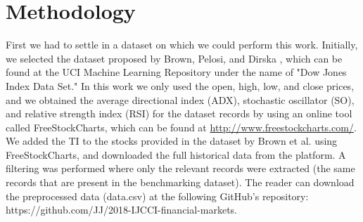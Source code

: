 \documentclass[a4paper,twoside]{article}
\begin{document}



\section{Methodology}
\label{proposed-method}


First we had to settle in a dataset on which we could perform this
work. Initially, we selected the dataset proposed  by Brown, Pelosi, and
Dirska \cite{brown2013dynamic}, which can be found at the UCI Machine
Learning Repository under the name of "Dow Jones Index Data Set." %
In
this work we only used the open, high, low, and close prices, and we
obtained the average directional index (ADX), stochastic oscillator
(SO), and relative strength index (RSI) for the dataset records by
using an online tool called FreeStockCharts, which can be found at
\url{http://www.freestockcharts.com/}. We added the TI to the stocks
provided in the dataset by Brown et al. using FreeStockCharts, and
downloaded the full historical data from the platform. A filtering was
performed where only the relevant records were extracted (the same
records that are present in the benchmarking dataset). The reader can
download the preprocessed data (data.csv) at the following GitHub's
repository: https://github.com/JJ/2018-IJCCI-financial-markets. %
\end{document}

